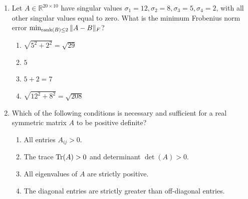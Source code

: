\begin{enumerate}[label=\textbf{MCQ\arabic*.}]
    \item Let $A \in \mathbb{R}^{20 \times 10}$ have singular values $\sigma_1 = 12, \sigma_2 = 8, \sigma_3 = 5, \sigma_4 = 2$, with all other singular values equal to zero. What is the minimum Frobenius norm error $\min_{\operatorname{rank}(B) \le 2} \|A - B\|_F$?
    \begin{enumerate}[label=(\alph*)]
        \item $\sqrt{5^2 + 2^2} = \sqrt{29}$
        \item $5$
        \item $5 + 2 = 7$
        \item $\sqrt{12^2 + 8^2} = \sqrt{208}$
    \end{enumerate}

    \item Which of the following conditions is necessary and sufficient for a real symmetric matrix $A$ to be positive definite?
    \begin{enumerate}[label=(\alph*)]
        \item All entries $A_{ij} > 0$.
        \item The trace $\operatorname{Tr}(A) > 0$ and determinant $\det(A) > 0$.
        \item All eigenvalues of $A$ are strictly positive.
        \item The diagonal entries are strictly greater than off-diagonal entries.
    \end{enumerate}
\end{enumerate}
